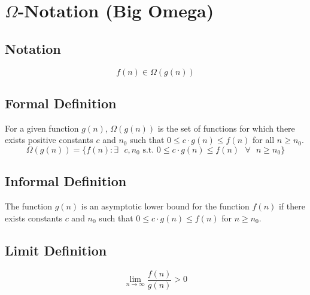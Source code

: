 \section{$\Omega$-Notation (Big Omega)}

\subsection*{Notation}
$$
f(n) \in \Omega(g(n))
$$

\subsection*{Formal Definition}
For a given function $g(n)$, $\Omega(g(n))$ is the set of functions for which there exists positive constants $c$ and $n_0$ such that $0 \leq c \cdot g(n) \leq f(n)$ for all $n \geq n_0$.
$$
\Omega(g(n)) = \{ f(n) : \exists \text{ } c, n_0 \text{ s.t. } 0 \leq c \cdot g(n) \leq f(n) \text{ } \forall \text{ } n \geq n_0 \}
$$

\subsection*{Informal Definition}
The function $g(n)$ is an asymptotic lower bound for the function $f(n)$ if there exists constants $c$ and $n_0$ such that $0 \leq c \cdot g(n) \leq f(n)$ for $n \geq n_0$.

\subsection*{Limit Definition}
$$
\lim\limits_{n \to \infty} \frac{f(n)}{g(n)} > 0
$$